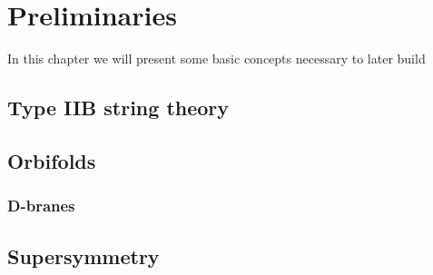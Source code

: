

\chapter{Preliminaries}
\label{chap:preliminaries}
\pagestyle{fancy}

In this chapter we will present some basic concepts necessary to later build 

\section{Type IIB string theory}


\section{Orbifolds}

 
\subsection{D-branes}


\section{Supersymmetry}

